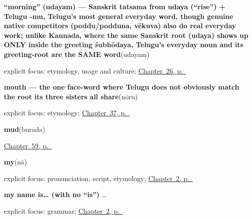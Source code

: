 \noindent\begin{minipage}[t]{\linewidth}
\raggedright
\textbf{\textquotedblleft{}morning\textquotedblright{} (udayam) — Sanskrit tatsama from udaya (\textquotedblleft{}rise\textquotedblright{}) + Telugu -mu, Telugu's most general everyday word, though genuine native competitors (poddu/podduna, vēkuva) also do real everyday work; unlike Kannada, where the same Sanskrit root (udaya) shows up ONLY inside the greeting śubhōdaya, Telugu's everyday noun and its greeting-root are the SAME word}\enspace\emph{}\enspace(udayam)\par
\footnotesize explicit focus: etymology, usage and culture; \hyperref[ch:te-morning]{Chapter~26, p.~\pageref*{ch:te-morning}}
\end{minipage}\par\smallskip

\noindent\begin{minipage}[t]{\linewidth}
\raggedright
\textbf{mouth — the one face-word where Telugu does not obviously match the root its three sisters all share}\enspace\emph{}\enspace(nōru)\par
\footnotesize explicit focus: etymology; \hyperref[ch:te-face-words]{Chapter~37, p.~\pageref*{ch:te-face-words}}
\end{minipage}\par\smallskip

\noindent\begin{minipage}[t]{\linewidth}
\raggedright
\textbf{mud}\enspace\emph{}\enspace(burada)\par
\footnotesize \hyperref[ch:te-weather-ground]{Chapter~59, p.~\pageref*{ch:te-weather-ground}}
\end{minipage}\par\smallskip

\noindent\begin{minipage}[t]{\linewidth}
\raggedright
\textbf{my}\enspace\emph{}\enspace(nā)\par
\footnotesize explicit focus: pronunciation, script, etymology; \hyperref[ch:introductions]{Chapter~2, p.~\pageref*{ch:introductions}}
\end{minipage}\par\smallskip

\noindent\begin{minipage}[t]{\linewidth}
\raggedright
\textbf{my name is… (with no \textquotedblleft{}is\textquotedblright{})}\enspace\emph{  …}\par
\footnotesize explicit focus: grammar; \hyperref[ch:introductions]{Chapter~2, p.~\pageref*{ch:introductions}}
\end{minipage}\par\smallskip

